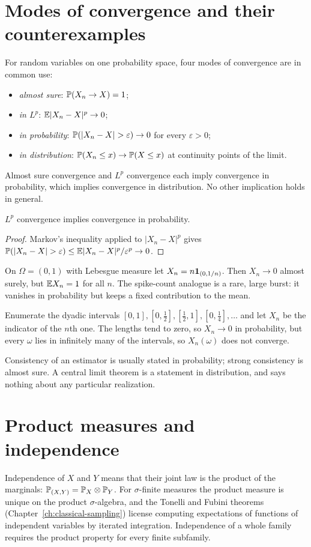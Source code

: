 \section{Modes of convergence and their counterexamples}
For random variables on one probability space, four modes of convergence
are in common use:
\begin{itemize}[leftmargin=2em]
\item \emph{almost sure}: $\mathbb{P}(X_n\to X)=1$;
\item \emph{in $L^p$}: $\mathbb{E}|X_n-X|^p\to0$;
\item \emph{in probability}: $\Prob(|X_n-X|>\varepsilon)\to0$ for every $\varepsilon>0$;
\item \emph{in distribution}: $\mathbb{P}(X_n\le x)\to\mathbb{P}(X\le x)$ at continuity points of the limit.
\end{itemize}
Almost sure convergence and $L^p$ convergence each imply convergence in
probability, which implies convergence in distribution. No other
implication holds in general.
\begin{proposition}
$L^p$ convergence implies convergence in probability.
\end{proposition}
\begin{proof}
Markov's inequality applied to $|X_n-X|^p$ gives
$\Prob(|X_n-X|>\varepsilon)\le\E|X_n-X|^p/\varepsilon^p\to0$.
\end{proof}
\begin{example}
On $\Omega=(0,1)$ with Lebesgue measure let $X_n=n\mathbf{1}_{(0,1/n)}$.
Then $X_n\to0$ almost surely, but $\mathbb{E} X_n=1$ for all $n$. The
spike-count analogue is a rare, large burst: it vanishes in probability
but keeps a fixed contribution to the mean.
\end{example}
\begin{example}
Enumerate the dyadic intervals $[0,1],[0,\tfrac12],[\tfrac12,1],[0,\tfrac14],\ldots$
and let $X_n$ be the indicator of the $n$th one. The lengths tend to
zero, so $X_n\to0$ in probability, but every $\omega$ lies in
infinitely many of the intervals, so $X_n(\omega)$ does not converge.
\end{example}
Consistency of an estimator is usually stated in probability; strong
consistency is almost sure. A central limit theorem is a statement in
distribution, and says nothing about any particular realization.

\section{Product measures and independence}
Independence of $X$ and $Y$ means that their joint law is the product
of the marginals: $\mathbb{P}_{(X,Y)}=\mathbb{P}_X\otimes\mathbb{P}_Y$. For $\sigma$-finite
measures the product measure is unique on the product $\sigma$-algebra,
and the Tonelli and Fubini theorems (Chapter~\ref{ch:classical-sampling})
license computing expectations of functions of independent variables
by iterated integration. Independence of a whole family requires the
product property for every finite subfamily.

